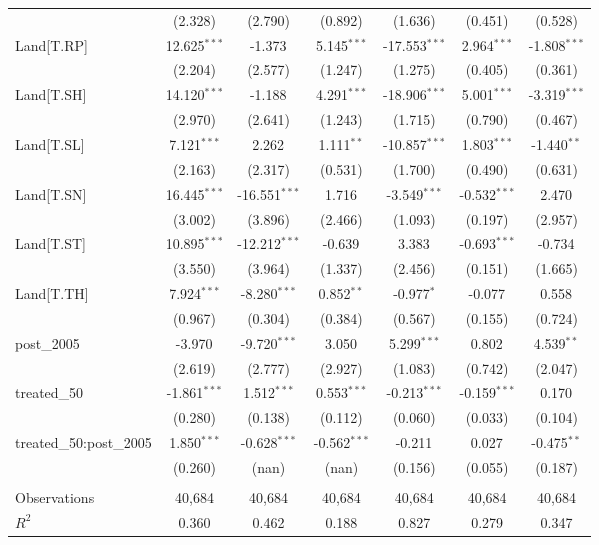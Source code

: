 \begin{table}[!htbp]
\begin{tabular}{@{\extracolsep{5pt}}lcccccc}
  & (2.328) & (2.790) & (0.892) & (1.636) & (0.451) & (0.528) \\
 Land[T.RP] & 12.625$^{***}$ & -1.373$^{}$ & 5.145$^{***}$ & -17.553$^{***}$ & 2.964$^{***}$ & -1.808$^{***}$ \\
  & (2.204) & (2.577) & (1.247) & (1.275) & (0.405) & (0.361) \\
 Land[T.SH] & 14.120$^{***}$ & -1.188$^{}$ & 4.291$^{***}$ & -18.906$^{***}$ & 5.001$^{***}$ & -3.319$^{***}$ \\
  & (2.970) & (2.641) & (1.243) & (1.715) & (0.790) & (0.467) \\
 Land[T.SL] & 7.121$^{***}$ & 2.262$^{}$ & 1.111$^{**}$ & -10.857$^{***}$ & 1.803$^{***}$ & -1.440$^{**}$ \\
  & (2.163) & (2.317) & (0.531) & (1.700) & (0.490) & (0.631) \\
 Land[T.SN] & 16.445$^{***}$ & -16.551$^{***}$ & 1.716$^{}$ & -3.549$^{***}$ & -0.532$^{***}$ & 2.470$^{}$ \\
  & (3.002) & (3.896) & (2.466) & (1.093) & (0.197) & (2.957) \\
 Land[T.ST] & 10.895$^{***}$ & -12.212$^{***}$ & -0.639$^{}$ & 3.383$^{}$ & -0.693$^{***}$ & -0.734$^{}$ \\
  & (3.550) & (3.964) & (1.337) & (2.456) & (0.151) & (1.665) \\
 Land[T.TH] & 7.924$^{***}$ & -8.280$^{***}$ & 0.852$^{**}$ & -0.977$^{*}$ & -0.077$^{}$ & 0.558$^{}$ \\
  & (0.967) & (0.304) & (0.384) & (0.567) & (0.155) & (0.724) \\
 post_2005 & -3.970$^{}$ & -9.720$^{***}$ & 3.050$^{}$ & 5.299$^{***}$ & 0.802$^{}$ & 4.539$^{**}$ \\
  & (2.619) & (2.777) & (2.927) & (1.083) & (0.742) & (2.047) \\
 treated_50 & -1.861$^{***}$ & 1.512$^{***}$ & 0.553$^{***}$ & -0.213$^{***}$ & -0.159$^{***}$ & 0.170$^{}$ \\
  & (0.280) & (0.138) & (0.112) & (0.060) & (0.033) & (0.104) \\
 treated_50:post_2005 & 1.850$^{***}$ & -0.628$^{***}$ & -0.562$^{***}$ & -0.211$^{}$ & 0.027$^{}$ & -0.475$^{**}$ \\
  & (0.260) & (nan) & (nan) & (0.156) & (0.055) & (0.187) \\
\hline \\[-1.8ex]
 Observations & 40,684 & 40,684 & 40,684 & 40,684 & 40,684 & 40,684 \\
 $R^2$ & 0.360 & 0.462 & 0.188 & 0.827 & 0.279 & 0.347 \\

\end{tabular}
\end{table}
